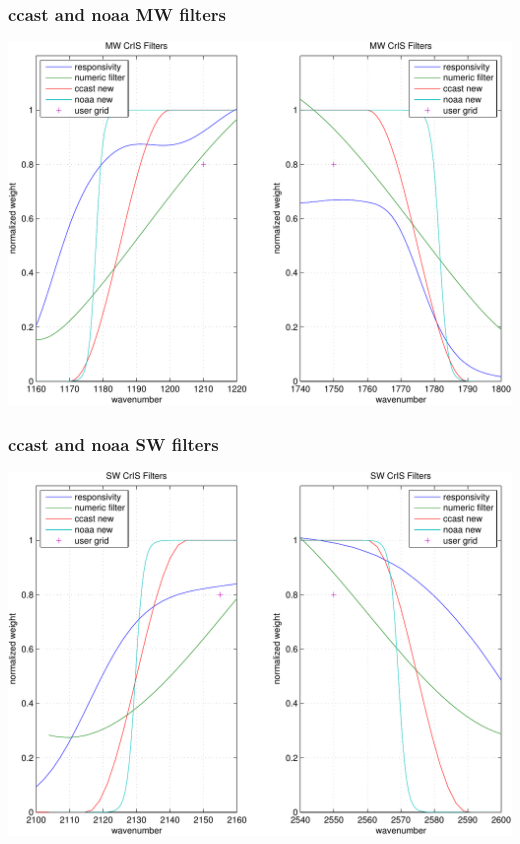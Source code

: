 \documentclass[11pt]{beamer}
\begin{document}
\begin{frame}
\frametitle{ccast and noaa MW filters}
\begin{center}
  \includegraphics[scale=0.5]{figures/show_filts_MW.pdf}
\end{center}
\end{frame}
\begin{frame}
\frametitle{ccast and noaa SW filters}
\begin{center}
  \includegraphics[scale=0.5]{figures/show_filts_SW.pdf}
\end{center}
\end{frame}
\end{document}
